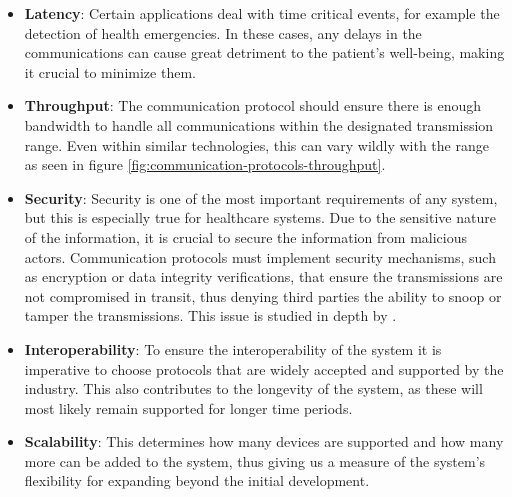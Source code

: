 \begin{itemize}
    \item \textbf{Latency}: Certain applications deal with time critical events, for example the detection of health emergencies. In these cases, any delays in the communications can cause great detriment to the patient's well-being, making it crucial to minimize them.
    \item \textbf{Throughput}: The communication protocol should ensure there is enough bandwidth to handle all communications within the designated transmission range. Even within similar technologies, this can vary wildly with the range as seen in figure \ref{fig:communication-protocols-throughput}. 
    \item \textbf{Security}: Security is one of the most important requirements of any system, but this is especially true for healthcare systems. Due to the sensitive nature of the information, it is crucial to secure the information from malicious actors. Communication protocols must implement security mechanisms, such as encryption or data integrity verifications, that ensure the transmissions are not compromised in transit, thus denying third parties the ability to snoop or tamper the transmissions. This issue is studied in depth by \cite{Gope2016}.
    \item \textbf{Interoperability}: To ensure the interoperability of the system it is imperative to choose protocols that are widely accepted and supported by the industry. This also contributes to the longevity of the system, as these will most likely remain supported for longer time periods. %
    \item \textbf{Scalability}: This determines how many devices are supported and how many more can be added to the system, thus giving us a measure of the system's flexibility for expanding beyond the initial development. 
\end{itemize}

